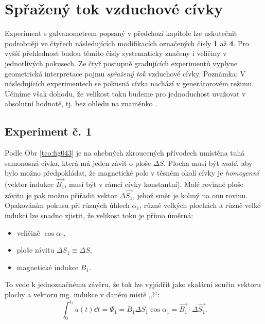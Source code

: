     \section{Spřažený tok vzduchové cívky}\label{ES:sec02}
      Experiment s galvanometrem popsaný v předchozí kapitole lze uskutečnit podrobněji ve čtyřech
      následujících modifikacích označených čísly \textbf{1} až \textbf{4}. Pro vyšší přehlednost
      budou těmito čísly systematicky značeny i veličiny v jednotlivých pokusech. Ze čtyř postupně
      gradujících experimentů vyplyne geometrická interpretace pojmu \emph{spřažený tok} vzduchové
      cívky. Poznámka: V následujících experimentech se pokusná  cívka nachází v generátorovém
      režimu. Učiníme však dohodu, že velikost toku budeme pro jednoduchost uvažovat v absolutní
      hodnotě, tj. bez ohledu na znaménko \cite[s.~12]{Patocka4}.

      \subsection{Experiment č. 1}
        Podle Obr \ref{teo:fig043} je na ohebných zkroucených přívodech umístěna tuhá samonosná
        cívka, která má jeden závit o ploše \(\Delta S\). Plocha musí být \emph{malá}, aby bylo
        možno předpokládat, že magnetické pole v těsném okolí cívky je \emph{homogenní} (vektor
        indukce \(\vec{B_1}\), musí být v rámci cívky konstantní). Malé rovinné ploše závitu je pak
        možno přiřadit vektor \(\Delta\vec{S_1}\), jehož směr je kolmý na onu rovinu. Opakováním
        pokusu při různých úhlech \(\alpha_1\), různě velkých plochách a různě velké indukci lze
        snadno zjistit, že velikost toku je přímo úměrná:


        \begin{itemize}[noitemsep]
          \item veličině \(\cos\alpha_1\),
          \item ploše závitu \(\Delta S_1 \equiv \Delta S\),
          \item magnetické indukce \(B_1\).
        \end{itemize}
        To vede k jednoznačnému závěru, že tok lze vyjádřit jako skalární součin vektoru plochy a
        vektoru mg. indukce v daném místě „l“:
        \begin{equation}\label{ES:eq_zakl_elm07}
          \int_0^{t_i} u(t)\dd{t} = \Psi_1 = B_1\Delta S_1\cos\alpha_1 = \vec{B_1}\cdot\Delta\vec{S_1}.
        \end{equation}  
     
